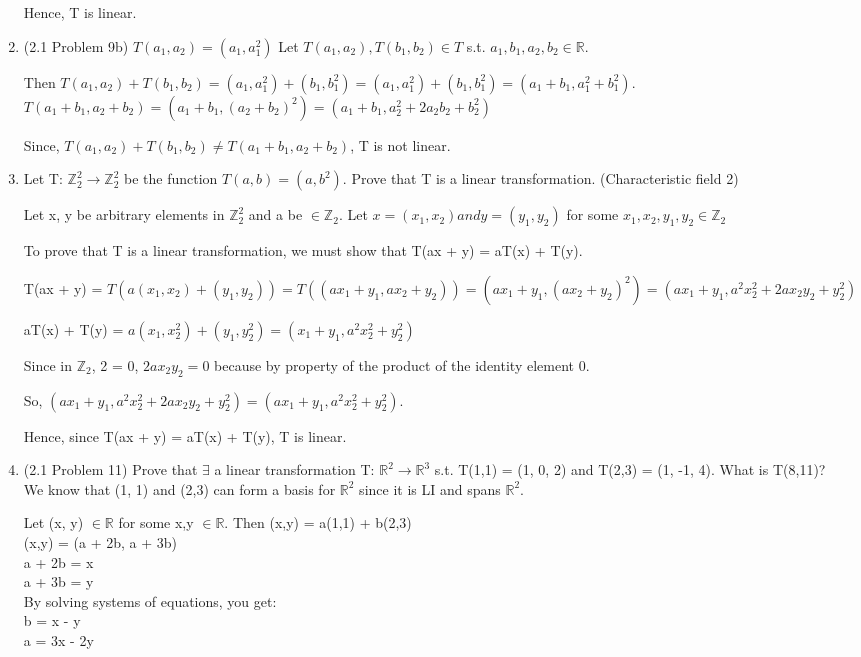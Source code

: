 \documentclass[12pt]{article}
\begin{document}
\begin{enumerate}
        Hence, T is linear. \qedsymbol{}

    
            
    \item (2.1 Problem 9b)
    $T(a_1, a_2) = (a_1, a^2_1)$ 
    Let $T(a_1, a_2), T(b_1, b_2) \in T$ s.t. $a_1, b_1, a_2, b_2 \in \mathbb{R}$. 

    Then $T(a_1, a_2) + T(b_1, b_2) = (a_1, a^2_1) + (b_1, b^2_1) = (a_1, a^2_1) + (b_1, b^2_1) = (a_1 + b_1, a^2_1 + b^2_1)$. \\
    $T(a_1 + b_1, a_2 + b_2) = (a_1 + b_1, (a_2 + b_2)^2) = (a_1 + b_1, a_2^2 + 2a_2b_2 + b_2^2)$ 

    Since, $T(a_1, a_2) + T(b_1, b_2) \neq T(a_1 + b_1, a_2 + b_2)$, T is not linear.

    \item Let T: $\mathbb{Z}_2^2 \xrightarrow{} \mathbb{Z}_2^2$ be the function $T(a, b) = (a, b^2).$ Prove that T is a linear transformation. (Characteristic field 2)

    Let x, y be arbitrary elements in $\mathbb{Z}_2^2$ and a be $\in \mathbb{Z}_2$. Let $x = (x_1, x_2) and y = (y_1, y_2)$ for some $x_1, x_2, y_1, y_2 \in \mathbb{Z}_2$
    
    To prove that T is a linear transformation, we must show that T(ax + y) = aT(x) + T(y). 

    T(ax + y) = $T(a(x_1, x_2) + (y_1, y_2)) = T((ax_1 + y_1, ax_2 + y_2)) = (ax_1 + y_1, (ax_2 + y_2)^2) = (ax_1 + y_1, a^2x_2^2 + 2ax_2y_2 + y_2^2)$ 

    aT(x) + T(y) = $a(x_1, x_2^2) + (y_1, y_2^2) = (x_1 + y_1, a^2x_2^2 + y_2^2)$

    Since in $\mathbb{Z}_2$, 2 = 0, $2ax_2y_2 = 0$ because by property of the product of the identity element 0.  

    So, $(ax_1 + y_1, a^2x_2^2 + 2ax_2y_2 + y_2^2) = (ax_1 + y_1, a^2x_2^2 + y_2^2)$. 

    Hence, since T(ax + y) = aT(x) + T(y), T is linear. \qedsymbol

    \item (2.1 Problem 11) Prove that $\exists$ a linear transformation T: $\mathbb{R}^2 \xrightarrow{} \mathbb{R}^3$ s.t. T(1,1) = (1, 0, 2) and T(2,3) = (1, -1, 4). What is T(8,11)? \\

    We know that (1, 1) and (2,3) can form a basis for $\mathbb{R}^2$ since it is LI and spans $\mathbb{R}^2$.

    Let (x, y) $\in \mathbb{R}$ for some x,y $\in \mathbb{R}$. 
    Then (x,y) = a(1,1) + b(2,3) \\
    (x,y) = (a + 2b, a + 3b) \\
    a + 2b = x \\
    a + 3b = y \\
    By solving systems of equations, you get: \\
    b = x - y \\
    a = 3x - 2y \\


\end{enumerate}
\end{document}
